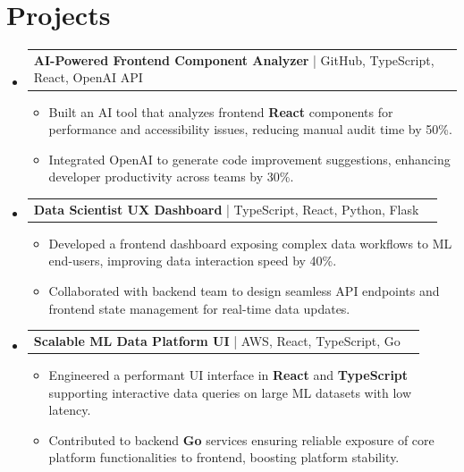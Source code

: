\documentclass[letterpaper,11pt]{article}
\makeatletter
\newcommand{\resumeItem}[1]{
  \item\footnotesize{
    {#1 \vspace{-2pt}}
  }
}
\newcommand{\resumeProjectHeading}[2]{
    \item
    \begin{tabular*}{1.001\textwidth}{l@{\extracolsep{\fill}}r}
      \small#1 & \textbf{\small #2}\\
    \end{tabular*}\vspace{-7pt}
}
\newcommand{\resumeSubHeadingListStart}{\begin{itemize}[leftmargin=0pt, label={}]}
\newcommand{\resumeSubHeadingListEnd}{\end{itemize}}
\newcommand{\resumeItemListStart}{\begin{itemize}[leftmargin=*]}
\newcommand{\resumeItemListEnd}{\end{itemize}\vspace{-5pt}}
\makeatother
\begin{document}
\section{Projects}
    \vspace{-5pt}
    \resumeSubHeadingListStart
          \resumeProjectHeading
              {\textbf{AI-Powered Frontend Component Analyzer} | GitHub, TypeScript, React, OpenAI API}{}
        \resumeItemListStart
            \resumeItem{Built an AI tool that analyzes frontend \textbf{React} components for performance and accessibility issues, reducing manual audit time by 50\%.}
            \resumeItem{Integrated OpenAI to generate code improvement suggestions, enhancing developer productivity across teams by 30\%.}
        \resumeItemListEnd
        \vspace{-12pt}
    
    \resumeProjectHeading
        {\textbf{Data Scientist UX Dashboard} | TypeScript, React, Python, Flask}{}
        \resumeItemListStart
            \resumeItem{Developed a frontend dashboard exposing complex data workflows to ML end-users, improving data interaction speed by 40\%.}
            \resumeItem{Collaborated with backend team to design seamless API endpoints and frontend state management for real-time data updates.}
        \resumeItemListEnd
          \vspace{-12pt}
      \resumeProjectHeading
          {\textbf{Scalable ML Data Platform UI} | AWS, React, TypeScript, Go}{}
          \resumeItemListStart
              \resumeItem{Engineered a performant UI interface in \textbf{React} and \textbf{TypeScript} supporting interactive data queries on large ML datasets with low latency.}
              \resumeItem{Contributed to backend \textbf{Go} services ensuring reliable exposure of core platform functionalities to frontend, boosting platform stability.}
          \resumeItemListEnd 
    \resumeSubHeadingListEnd
\end{document}

